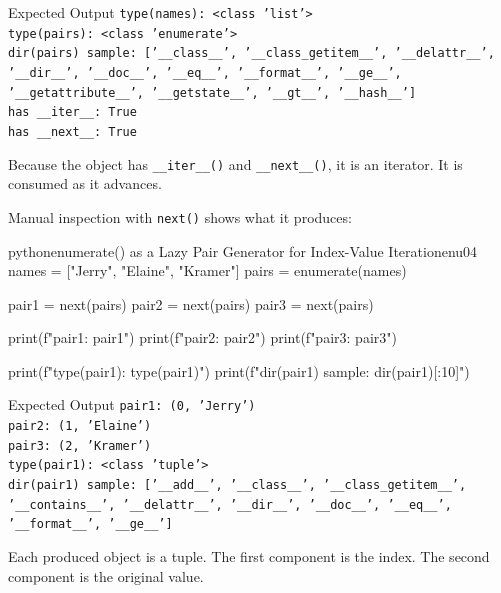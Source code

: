 \begin{iobox}{Expected Output}
\texttt{type(names): <class 'list'>} \\
\texttt{type(pairs): <class 'enumerate'>} \\
\texttt{dir(pairs) sample: ['\_\_class\_\_', '\_\_class\_getitem\_\_', '\_\_delattr\_\_',} \\
\texttt{'\_\_dir\_\_', '\_\_doc\_\_', '\_\_eq\_\_', '\_\_format\_\_', '\_\_ge\_\_',} \\
\texttt{'\_\_getattribute\_\_', '\_\_getstate\_\_', '\_\_gt\_\_', '\_\_hash\_\_']} \\
\texttt{has \_\_iter\_\_: True} \\
\texttt{has \_\_next\_\_: True} \\
\end{iobox}


Because the object has \texttt{\_\_iter\_\_()} and \texttt{\_\_next\_\_()}, it is an iterator. It is consumed as it advances.

Manual inspection with \texttt{next()} shows what it produces:

\begin{codebox}[]{python}{enumerate() as a Lazy Pair Generator for Index-Value Iteration}{enu04}
names = ["Jerry", "Elaine", "Kramer"]
pairs = enumerate(names)

pair1 = next(pairs)
pair2 = next(pairs)
pair3 = next(pairs)

print(f"pair1: {pair1}")
print(f"pair2: {pair2}")
print(f"pair3: {pair3}")

print(f"type(pair1): {type(pair1)}")
print(f"dir(pair1) sample: {dir(pair1)[:10]}")
\end{codebox}


\begin{iobox}{Expected Output}
\texttt{pair1: (0, 'Jerry')} \\
\texttt{pair2: (1, 'Elaine')} \\
\texttt{pair3: (2, 'Kramer')} \\
\texttt{type(pair1): <class 'tuple'>} \\
\texttt{dir(pair1) sample: ['\_\_add\_\_', '\_\_class\_\_', '\_\_class\_getitem\_\_',} \\
\texttt{'\_\_contains\_\_', '\_\_delattr\_\_', '\_\_dir\_\_', '\_\_doc\_\_', '\_\_eq\_\_',} \\
\texttt{'\_\_format\_\_', '\_\_ge\_\_']} \\
\end{iobox}


Each produced object is a tuple. The first component is the index. The second component is the original value.

